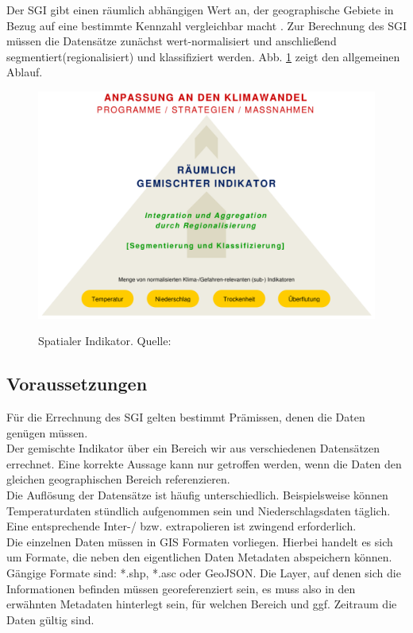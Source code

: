 \documentclass[10pt,conference,compsocconf]{IEEEtran}
\begin{document}
Der SGI gibt einen räumlich abhängigen Wert an, der geographische Gebiete in Bezug auf eine bestimmte Kennzahl vergleichbar macht \cite{anselin1995local}. Zur Berechnung des SGI müssen die Datensätze zunächst wert-normalisiert und anschließend segmentiert(regionalisiert) und klassifiziert werden. Abb. \ref{img:Spatialer_Indikator} zeigt den allgemeinen Ablauf.\\
\begin{figure}[H]
	\centering
	\includegraphics[width=1\columnwidth]{img/Spatialer_Indikator.png} \\
	\caption[]{Spatialer Indikator. Quelle: \cite{mariuszMaster}}
	\label{img:Spatialer_Indikator}
\end{figure}


\subsection{Voraussetzungen}
Für die Errechnung des SGI gelten bestimmt Prämissen, denen die Daten genügen müssen.\\
Der gemischte Indikator über ein Bereich wir aus verschiedenen Datensätzen errechnet. Eine korrekte Aussage kann nur getroffen werden, wenn die Daten den gleichen geographischen Bereich referenzieren.\\
Die Auflösung der Datensätze ist häufig unterschiedlich. Beispielsweise können Temperaturdaten stündlich aufgenommen sein und Niederschlagsdaten täglich. Eine entsprechende Inter-/ bzw. extrapolieren ist zwingend erforderlich.\\
Die einzelnen Daten müssen in GIS Formaten vorliegen. Hierbei handelt es sich um Formate, die neben den eigentlichen Daten Metadaten abspeichern können. Gängige Formate sind: *.shp, *.asc oder GeoJSON.
Die Layer, auf denen sich die Informationen befinden müssen georeferenziert sein, es muss also in den erwähnten Metadaten hinterlegt sein, für welchen Bereich und ggf. Zeitraum die Daten gültig sind.
\end{document}

